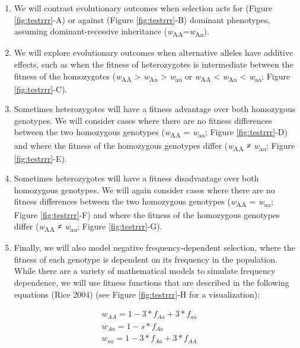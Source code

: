 \documentclass[
]{book}
\begin{document}
\begin{enumerate}
\def\labelenumi{\arabic{enumi}.}
\item
  We will contrast evolutionary outcomes when selection acts for (Figure \ref{fig:testrrr}-A) or against (Figure \ref{fig:testrrr}-B) dominant phenotypes, assuming dominant-recessive inheritance (\emph{w}\textsubscript{AA}=\emph{w}\textsubscript{Aa}).
\item
  We will explore evolutionary outcomes when alternative alleles have additive effects, such as when the fitness of heterozygotes is intermediate between the fitness of the homozygotes (\emph{w}\textsubscript{AA} \textgreater{} \emph{w}\textsubscript{Aa} \textgreater{} \emph{w}\textsubscript{aa} or \emph{w}\textsubscript{AA} \textless{} \emph{w}\textsubscript{Aa} \textless{} \emph{w}\textsubscript{aa}; Figure \ref{fig:testrrr}-C).
\item
  Sometimes heterozygotes will have a fitness advantage over both homozygous genotypes. We will consider cases where there are no fitness differences between the two homozygous genotypes (\emph{w}\textsubscript{AA} = \emph{w}\textsubscript{aa}; Figure \ref{fig:testrrr}-D) and where the fitness of the homozygous genotypes differ (\emph{w}\textsubscript{AA} ≠ \emph{w}\textsubscript{aa}; Figure \ref{fig:testrrr}-E).
\item
  Sometimes heterozygotes will have a fitness disadvantage over both homozygous genotypes. We will again consider cases where there are no fitness differences between the two homozygous genotypes (\emph{w}\textsubscript{AA} = \emph{w}\textsubscript{aa}; Figure \ref{fig:testrrr}-F) and where the fitness of the homozygous genotypes differ (\emph{w}\textsubscript{AA} ≠ \emph{w}\textsubscript{aa}; Figure \ref{fig:testrrr}-G).
\item
  Finally, we will also model negative frequency-dependent selection, where the fitness of each genotype is dependent on its frequency in the population. While there are a variety of mathematical models to simulate frequency dependence, we will use fitness functions that are described in the following equations (Rice 2004) (see Figure \ref{fig:testrrr}-H for a visualization):
\end{enumerate}

\begin{align}
w_{AA}=1-3*f_{Aa}+3*f_{aa} \label{eq:19}\\
w_{Aa}=1-s*f_{Aa} \label{eq:20}\\
w_{aa}=1-3*f_{Aa}+3*f_{AA} \label{eq:21}
\end{align}
\end{document}
